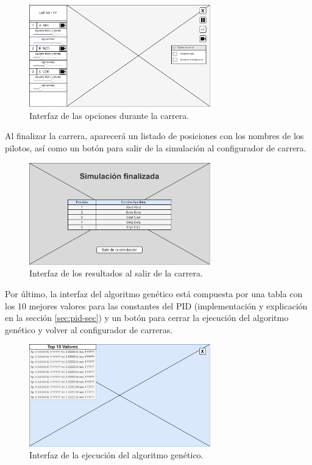 \begin{figure}[H]
    \centering
    \includegraphics[width=0.7\textwidth]{imagenes/pag2.png}
    \caption{Interfaz de las opciones durante la carrera.}
    \label{fig:boc-ui-race}
\end{figure}

Al finalizar la carrera, aparecerá un listado de posiciones con los nombres de los pilotos, así como un botón para salir de la simulación al configurador de carrera.

\begin{figure}[H]
    \centering
    \includegraphics[width=0.7\textwidth]{imagenes/pantallafinal.png}
    \caption{Interfaz de los resultados al salir de la carrera.}
    \label{fig:resultados-sim}
\end{figure}

Por último, la interfaz del algoritmo genético está compuesta por una tabla con los 10 mejores valores para las constantes del PID (implementación y explicación en la sección \ref{sec:pid-sec}) y un botón para cerrar la ejecución del algoritmo genético y volver al configurador de carreras.

\begin{figure}[H]
    \centering
    \includegraphics[width=0.7\textwidth]{imagenes/ga.png}
    \caption{Interfaz de la ejecución del algoritmo genético.}
\end{figure}

